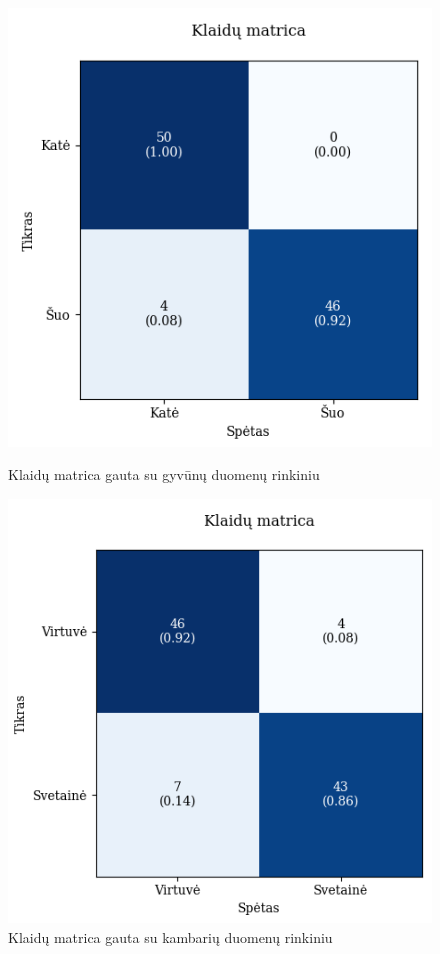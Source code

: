 \documentclass{VUMIFPSbakalaurinis}
\begin{document}
\begin{figure}[!htbp]
    \centering
    \begin{minipage}[b]{0.48\textwidth}
      \includegraphics[width=\textwidth]{img/GrapthsNEW/Large/animal/20/KM_DC_L_20.png}
      \caption{Klaidų matrica gauta su gyvūnų duomenų rinkiniu}
    \end{minipage}
    \hspace{2mm}
    \begin{minipage}[b]{0.48\textwidth}
      \includegraphics[width=\textwidth]{img/GrapthsNEW/Large/room/20/KM_R_L_20.png}
      \caption{Klaidų matrica gauta su kambarių duomenų rinkiniu}
    \end{minipage}
\end{figure}
\end{document}
